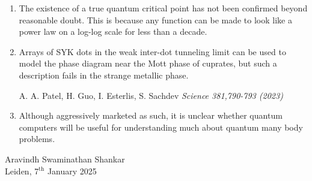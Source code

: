 \documentclass[pdftex,a5paper]{dissertation}
\begin{document}
{\begin{enumerate}[leftmargin=*]
\item The existence of a true quantum critical point has not been confirmed beyond reasonable doubt. This is because any function can be made to look like a power law on a log-log scale for less than a decade.  

\item Arrays of SYK dots in the weak inter-dot tunneling limit can be used to model the phase diagram near the Mott phase of cuprates, but such a description fails in the strange metallic phase.
\vspace{-2pt}
\begin{flushright}
    A. A. Patel, H. Guo, I. Esterlis, S. Sachdev \emph{Science 381,790-793 (2023)} 
\end{flushright}


\item Although aggressively marketed as such, it is unclear whether quantum computers will be useful for understanding much about quantum many body problems. 

\end{enumerate}

\vspace{10pt}

\begin{flushright}

Aravindh Swaminathan Shankar\\
Leiden, 7$^{\text{th}}$ January 2025

\end{flushright}
}
\end{document}
